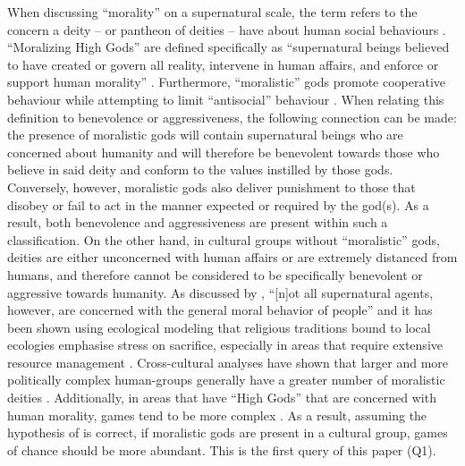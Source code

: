 When discussing \enquote{morality} on a supernatural scale, the term refers to the concern a deity – or pantheon of deities – have about human social behaviours \parencite{purzycki2016}. \enquote{Moralizing High Gods} are defined specifically as \enquote{supernatural beings believed to have created or govern all reality, intervene in human affairs, and enforce or support human morality} \parencite[16784]{botero2014}. Furthermore, \enquote{moralistic} gods promote cooperative behaviour while attempting to limit ``antisocial” behaviour \parencite[165]{purzycki2016}. When relating this definition to benevolence or aggressiveness, the following connection can be made: the presence of moralistic gods will contain supernatural beings who are concerned about humanity and will therefore be benevolent towards those who believe in said deity and conform to the values instilled by those gods. Conversely, however, moralistic gods also deliver punishment to those that disobey or fail to act in the manner expected or required by the god(s). As a result, both benevolence and aggressiveness are present within such a classification. On the other hand, in cultural groups without ``moralistic” gods, deities are either unconcerned with human affairs or are extremely distanced from humans, and therefore cannot be considered to be specifically benevolent or aggressive towards humanity. As discussed by \parencite[85]{purzycki2011}, ``[n]ot all supernatural agents, however, are concerned with the general moral behavior of people” and it has been shown using ecological modeling that religious traditions bound to local ecologies emphasise stress on sacrifice, especially in areas that require extensive resource management \parencite{lansing1993}. Cross-cultural analyses have shown that larger and more politically complex human-groups generally have a greater number of moralistic deities \parencite{purzycki2016}. Additionally, in areas that have ``High Gods” that are concerned with human morality, games tend to be more complex \parencite[290]{ball1972}. As a result, assuming the hypothesis of \textcite{roberts1959} is correct, if moralistic gods are present in a cultural group, games of chance should be more abundant. This is the first query of this paper (Q1).

